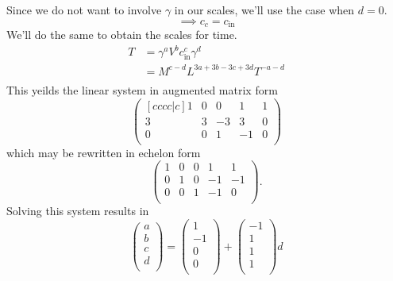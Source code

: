 \documentclass[12pt]{article}
\begin{document}
Since we do not want to involve $\gamma$ in our scales, we'll use the case when
$d=0$.
\begin{equation*}
  \implies c_c = c_{\text{in}}
\end{equation*}
We'll do the same to obtain the scales for time.
\begin{equation*}
  \begin{aligned}
    T &= \gamma^aV^bc_{\text{in}}^c\gamma^d \\
    &= M^{c-d}L^{3a+3b-3c+3d}T^{-a-d} \\
  \end{aligned}
\end{equation*}
This yeilds the linear system in augmented matrix form
\begin{equation*}
  \begin{pmatrix}[cccc|c]
    1 & 0 & 0 & 1 & 1 \\
    3 & 3 & -3 & 3 & 0 \\
    0 & 0 & 1 & -1 & 0 \\
  \end{pmatrix}
\end{equation*}
which may be rewritten in echelon form
\begin{equation*}
  \begin{pmatrix}
    1 & 0 & 0 & 1 & 1 \\
    0 & 1 & 0 & -1 & -1 \\
    0 & 0 & 1 & -1 & 0 \\
  \end{pmatrix}.
\end{equation*}
Solving this system results in
\begin{equation*}
  \begin{pmatrix}
    a \\ b \\ c \\ d \\
  \end{pmatrix} =
  \begin{pmatrix}
    1 \\ -1 \\ 0 \\ 0 \\
  \end{pmatrix} +
  \begin{pmatrix}
    -1 \\ 1 \\ 1 \\ 1 \\
  \end{pmatrix}d
\end{equation*}
\end{document}
